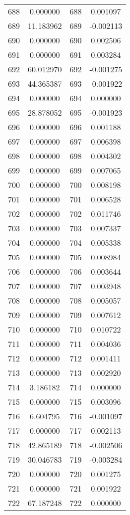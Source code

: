 \documentclass[12pt]{article}
\begin{document}
\begin{longtable}{@{}cccc@{}}
688 & 0.000000 & 688 & 0.001097 \\
689 & 11.183962 & 689 & -0.002113 \\
690 & 0.000000 & 690 & 0.002506 \\
691 & 0.000000 & 691 & 0.003284 \\
692 & 60.012970 & 692 & -0.001275 \\
693 & 44.365387 & 693 & -0.001922 \\
694 & 0.000000 & 694 & 0.000000 \\
695 & 28.878052 & 695 & -0.001923 \\
696 & 0.000000 & 696 & 0.001188 \\
697 & 0.000000 & 697 & 0.006398 \\
698 & 0.000000 & 698 & 0.004302 \\
699 & 0.000000 & 699 & 0.007065 \\
700 & 0.000000 & 700 & 0.008198 \\
701 & 0.000000 & 701 & 0.006528 \\
702 & 0.000000 & 702 & 0.011746 \\
703 & 0.000000 & 703 & 0.007337 \\
704 & 0.000000 & 704 & 0.005338 \\
705 & 0.000000 & 705 & 0.008984 \\
706 & 0.000000 & 706 & 0.003644 \\
707 & 0.000000 & 707 & 0.003948 \\
708 & 0.000000 & 708 & 0.005057 \\
709 & 0.000000 & 709 & 0.007612 \\
710 & 0.000000 & 710 & 0.010722 \\
711 & 0.000000 & 711 & 0.004036 \\
712 & 0.000000 & 712 & 0.001411 \\
713 & 0.000000 & 713 & 0.002920 \\
714 & 3.186182 & 714 & 0.000000 \\
715 & 0.000000 & 715 & 0.003096 \\
716 & 6.604795 & 716 & -0.001097 \\
717 & 0.000000 & 717 & 0.002113 \\
718 & 42.865189 & 718 & -0.002506 \\
719 & 30.046783 & 719 & -0.003284 \\
720 & 0.000000 & 720 & 0.001275 \\
721 & 0.000000 & 721 & 0.001922 \\
722 & 67.187248 & 722 & 0.000000 \\

\end{longtable}
\end{document}
